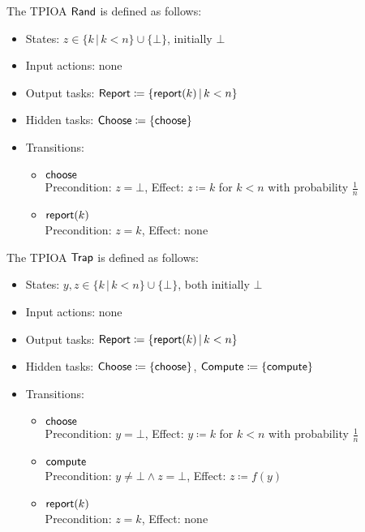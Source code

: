 \documentclass[10pt]{article}
\begin{document}
\begin{example}[$\Rand$]
The TPIOA $\Rand$ is defined as follows:
\begin{itemize}
\item States: $z \in \{k \, | \, k < n\} \cup \{\bot\}$, initially $\bot$
\item Input actions: none
\item Output tasks: $\mathsf{Report} \coloneqq \{\mathsf{report}(k) \, | \, k < n\}$
\item Hidden tasks: $\mathsf{Choose} \coloneqq \{\mathsf{choose}\}$
\item Transitions:
\begin{itemize}
\item $\mathsf{choose}$ \\
Precondition: $z = \bot$, Effect: $z \coloneqq k$ for $k < n$ with probability $\frac{1}{n}$
\item $\mathsf{report}(k)$ \\
Precondition: $z = k$, Effect: none
\end{itemize}
\end{itemize}
\end{example}

\begin{example}[$\Trap$]
The TPIOA $\Trap$ is defined as follows:
\begin{itemize}
\item States: $y,z \in \{k \, | \, k < n\} \cup \{\bot\}$, both initially $\bot$
\item Input actions: none
\item Output tasks: $\mathsf{Report} \coloneqq \{\mathsf{report}(k) \, | \, k < n\}$
\item Hidden tasks: $\mathsf{Choose} \coloneqq \{\mathsf{choose}\}$, $\mathsf{Compute} \coloneqq \{\mathsf{compute}\}$ 
\item Transitions:
\begin{itemize}
\item $\mathsf{choose}$ \\
Precondition: $y = \bot$, Effect: $y \coloneqq k$ for $k < n$ with probability $\frac{1}{n}$
\item $\mathsf{compute}$ \\
Precondition: $y \neq \bot \wedge z = \bot$, Effect: $z \coloneqq f(y)$
\item $\mathsf{report}(k)$ \\
Precondition: $z = k$, Effect: none
\end{itemize}
\end{itemize}
\end{example}
\end{document}
